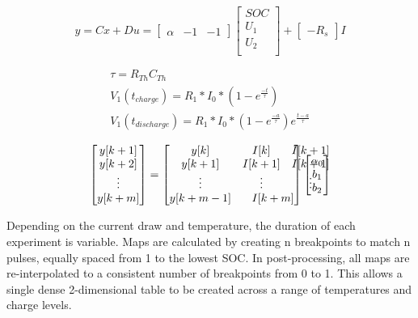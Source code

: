 \documentclass[]{aiaa-tc}%
\begin{document}
\[
y = Cx + Du = 
\begin{bmatrix}
    \alpha & -1 & -1
\end{bmatrix}
\begin{bmatrix}
    SOC \\
    U_{1} \\
    U_{2} \\
\end{bmatrix}
+
\begin{bmatrix}
    -R_{s}
\end{bmatrix}
I
\]


\begin{align}
    \tau = R_{Th}C_{Th} \\
    V_{1}(t_{charge}) = R_{1}*I_{0}*(1-e^{\frac{-t}{\tau}})\\
    V_{1}(t_{discharge}) = R_{1}*I_{0}*(1-e^{\frac{-a}{\tau}})e^{\frac{t-a}{\tau}}
\end{align}


\[
\begin{bmatrix}
    y[k+1] \\
    y[k+2] \\ 
    \vdots \\
    y[k+m] \\
\end{bmatrix}
=
\begin{bmatrix}
    y[k] & I[k] & I[k+1] \\
    y[k+1] & I[k+1] & I[k+1] \\
    \vdots  & \vdots  & \vdots \\
    y[k+m-1] & \hdotsfor{3} & I[k+m] \\
\end{bmatrix}
\begin{bmatrix}
    \alpha_{0} \\
    b_{1} \\
    b_{2} \\
\end{bmatrix}
\]





Depending on the current draw and temperature, the duration of each experiment is variable. Maps are calculated by creating n breakpoints to match n pulses, equally spaced from 1 to the lowest SOC. In post-processing, all maps are re-interpolated to a consistent number of breakpoints from 0 to 1. This allows a single dense 2-dimensional table to be created across a range of temperatures and charge levels.
\end{document}

